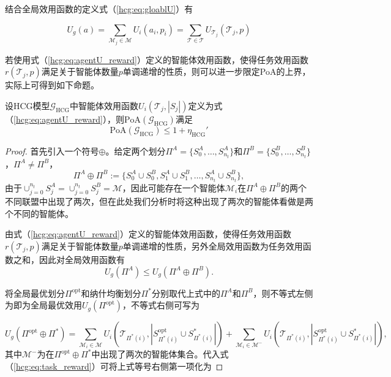 结合全局效用函数的定义式（\ref{hcg:eq:gloablU}）有

\begin{equation}
\label{hcg:eq:taskU_to_globalU}
	U_g(a) = \sum_{\mathcal{M}_j \in \mathcal{M}} U_i(a_i,p_i) = \sum_{\mathcal{T} \in \mathcal{T}} U_{\mathcal{T}_j}(\mathcal{T}_j,p)
\end{equation}

若使用式（\ref{hcg:eq:agentU_reward}）定义的智能体效用函数，使得任务效用函数$r(\mathcal{T}_j,p)$满足关于智能体数量$p$单调递增的性质，则可以进一步限定PoA的上界，实际上可得到如下命题。

\begin{proposition}
	设HCG模型$\mathcal{G}_{\text{HCG}}$中智能体效用函数$U_i(\mathcal{T}_j,|S_j|)$定义为式（\ref{hcg:eq:agentU_reward}），则$\mathrm{PoA}(\mathcal{G}_{\text{HCG}})$满足
	\begin{equation}
	\label{hcg:eq:PoAforU}
		\mathrm{PoA}(\mathcal{G}_{\text{HCG}}) \leq 1 + \eta_{\text{HCG}}'
	\end{equation}
	
	\begin{proof}
		首先引入一个符号$\oplus$。给定两个划分$\Pi^A = \{S_0^A,\dots,S_{n_t}^A\}$和$\Pi^B = \{S_0^B,\dots,S_{n_t}^B\}$，$\Pi^A \neq \Pi^B$，
		\begin{equation}
		\label{hcg:pro:eq:oplus}
			\Pi^A \oplus \Pi^B := \{S_0^A \cup S_0^B, S_1^A \cup S_1^B, \dots, S_{n_t}^A \cup S_{n_t}^B \},
		\end{equation}
		由于$\cup_{j=0}^{n_t} S_j^A = \cup_{j=0}^{n_t} S_j^B = \mathcal{M}$，因此可能存在一个智能体$\mathcal{M}_i$在$\Pi^A \oplus \Pi^B$的两个不同联盟中出现了两次，但在此处我们分析时将这种出现了两次的智能体看做是两个不同的智能体。
		
		由式（\ref{hcg:eq:agentU_reward}）定义的智能体效用函数，使得任务效用函数$r(\mathcal{T}_j,p)$满足关于智能体数量$p$单调递增的性质，另外全局效用函数为任务效用函数之和，因此对全局效用函数有
		\begin{equation}
			U_g(\Pi^A) \leq U_g(\Pi^A \oplus \Pi^B).
		\end{equation}
		
		将全局最优划分$\Pi^{\text{opt}}$和纳什均衡划分$\Pi^*$分别取代上式中的$\Pi^A$和$\Pi^B$，则不等式左侧为即为全局最优效用$U_g(\Pi^{\text{opt}})$，不等式右侧可写为
		
		\begin{equation}
		\label{hcg:pro:inequlity}
			U_g(\Pi^{\text{opt}} \oplus \Pi^*) = \sum_{\mathcal{M}_i \in \mathcal{M}} U_i(\mathcal{T}_{\Pi^*(i)}, |S_{\Pi^*(i)}^{\text{opt}} \cup S_{\Pi^*(i)}^*|) + \sum_{\mathcal{M}_i \in \mathcal{M}^-} U_i(\mathcal{T}_{\Pi^*(i)}, |S_{\Pi^*(i)}^{\text{opt}} \cup S_{\Pi^*(i)}^*|),
		\end{equation}
		其中$\mathcal{M}^-$为在$\Pi^{\text{opt}} \oplus \Pi^*$中出现了两次的智能体集合。代入式（\ref{hcg:eq:task_reward}）可将上式等号右侧第一项化为
		

\end{proof}
\end{proposition}
